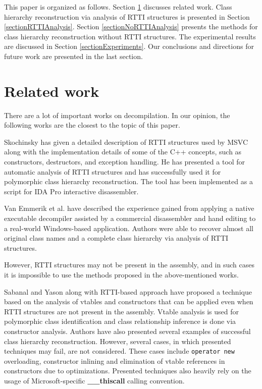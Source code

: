 \documentclass[10pt, conference]{IEEEtran}
\begin{document}
This paper is organized as follows. Section
\ref{sectionRelatedWork} discusses related work.
Class hierarchy reconstruction via analysis of RTTI structures
is presented in Section \ref{sectionRTTIAnalysis}.
Section \ref{sectionNoRTTIAnalysis} presents the methods for class
hierarchy reconstruction without RTTI structures.
The experimental results are discussed in Section \ref{sectionExperiments}.
Our conclusions and directions for future work are
presented in the last section.





\section{Related work}
\label{sectionRelatedWork}
There are a lot of important works on decompilation.
In our opinion, the following works are the closest to the topic of this paper.

Skochinsky \cite{skochinsky06} has given a detailed description
of RTTI structures used by MSVC
along with the implementation details of some of the C++ concepts,
such as constructors, destructors, and exception handling.
He has presented a tool for automatic analysis of RTTI structures
and has successfully used it for polymorphic class hierarchy
reconstruction. The tool has been implemented as a script for IDA Pro
interactive disassembler.

Van Emmerik et al. \cite{emmerik04} have described
the experience gained from applying
a native executable decompiler
assisted by a commercial disassembler and hand editing
to a real-world Windows-based application.
Authors were able to recover almost all original class names
and a complete class hierarchy via analysis of RTTI structures.

However, RTTI structures may not be present in the assembly, and in
such cases it is impossible to use the methods proposed in the
above-mentioned works.

Sabanal and Yason \cite{sabanal07} along with RTTI-based approach
have proposed a technique based on the analysis of vtables and
constructors that can be applied even when RTTI structures are
not present in the assembly.
Vtable analysis is used for polymorphic class identification
and class relationship inference is done via constructor analysis.
Authors have also presented several examples of successful class
hierarchy reconstruction.
However, several cases, in which presented techniques may fail, are
not considered.
These cases include \lstinline{operator new} overloading,
constructor inlining and elimination of vtable references in
constructors due to optimizations.
Presented techniques also heavily rely on the usage of
Microsoft-specific \textbf{\_\_thiscall} calling convention.
\end{document}
